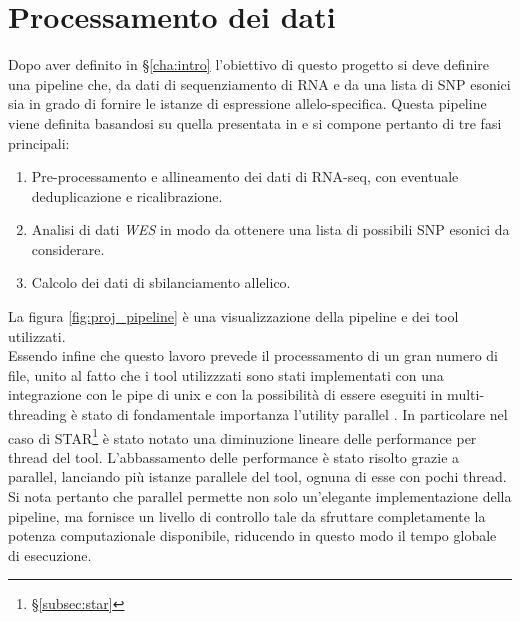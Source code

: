 \graphicspath{{chapters/03/media/}}
\chapter{Processamento dei dati}
\label{cha:processamento}
Dopo aver definito in \S\ref{cha:intro} l'obiettivo di questo progetto si deve definire una pipeline che, da dati di sequenziamento di RNA e da una lista di SNP esonici  sia in grado di fornire le istanze di espressione allelo-specifica.
Questa pipeline viene definita basandosi su quella presentata in \cite{ase_pipeline} e si compone pertanto di tre fasi principali:
\begin{enumerate}
	\item Pre-processamento e allineamento dei dati di RNA-seq, con eventuale deduplicazione e ricalibrazione.
	\item Analisi di dati \emph{WES} in modo da ottenere una lista di possibili SNP esonici da considerare.
	\item Calcolo dei dati di sbilanciamento allelico.
\end{enumerate}
La figura \ref{fig:proj_pipeline} \`e una visualizzazione della pipeline e dei tool utilizzati.\\
Essendo infine che questo lavoro prevede il processamento di un gran numero di file, unito al fatto che i tool utilizzzati sono stati implementati con una integrazione con le pipe di unix e con la possibilit\`a di essere eseguiti in multi-threading \`e stato di fondamentale importanza l'utility parallel \cite{parallel}.
In particolare nel caso di STAR\footnote{\S\ref{subsec:star}} \`e stato notato una diminuzione lineare delle performance per thread del tool.
L'abbassamento delle performance \`e stato risolto grazie a parallel, lanciando pi\`u istanze parallele del tool, ognuna di esse con pochi thread.
Si nota pertanto che parallel permette non solo un'elegante implementazione della pipeline, ma fornisce un livello di controllo tale da sfruttare completamente la potenza computazionale disponibile, riducendo in questo modo il tempo globale di esecuzione.


